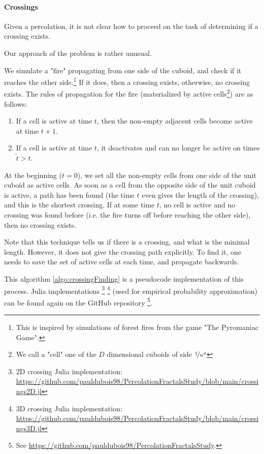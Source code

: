 \paragraph{Crossings}\label{crossingAlgorithm}
Given a percolation, it is not clear how to proceed on the task of determining if a crossing exists.

Our approach of the problem is rather unusual.

We simulate a "fire" propagating from one side of the cuboid, and check if it reaches the other side.\footnote{This is inspired by simulations of forest fires from the game "The Pyromaniac Game"\cite{pyromaniacGame}.}
If it does, then a crossing exists, otherwise, no crossing exists.
The rules of propagation for the fire (materialized by active cells\footnote{We call a "cell" one of the $D$ dimensional cuboids of side $\nicefrac{1}{n^d}$}) are as follows:
\begin{enumerate}
	\item If a cell is active at time $t$, then the non-empty adjacent cells become active at time $t+1$.
	\item If a cell is active at time $t$, it deactivates and can no longer be active on times $\tilde{t}>t$.
\end{enumerate}
At the beginning ($t=0$), we set all the non-empty cells from one side of the unit cuboid as active cells.
As soon as a cell from the opposite side of the unit cuboid is active, a path has been found (the time $t$ even gives the length of the crossing), and this is the shortest crossing.
If at some time $t$, no cell is active and no crossing was found before (i.e. the fire turns off before reaching the other side), then no crossing exists.

Note that this technique tells us if there is a crossing, and what is the minimal length. However, it does not give the crossing path explicitly.
To find it, one needs to save the set of active cells at each time, and propagate backwards.

This algorithm \ref{algo:crossingFinding} is a pseudocode implementation of this process.
Julia implementations
\footnote{2D crossing Julia implementation: \url{https://github.com/pauldubois98/PercolationFractalsStudy/blob/main/crossings2D.jl}}
\footnote{3D crossing Julia implementation: \url{https://github.com/pauldubois98/PercolationFractalsStudy/blob/main/crossings3D.jl}}
(used for empirical probability approximation) can be found again on the GitHub repository
\footnote{See \url{https://github.com/pauldubois98/PercolationFractalsStudy}.}.


